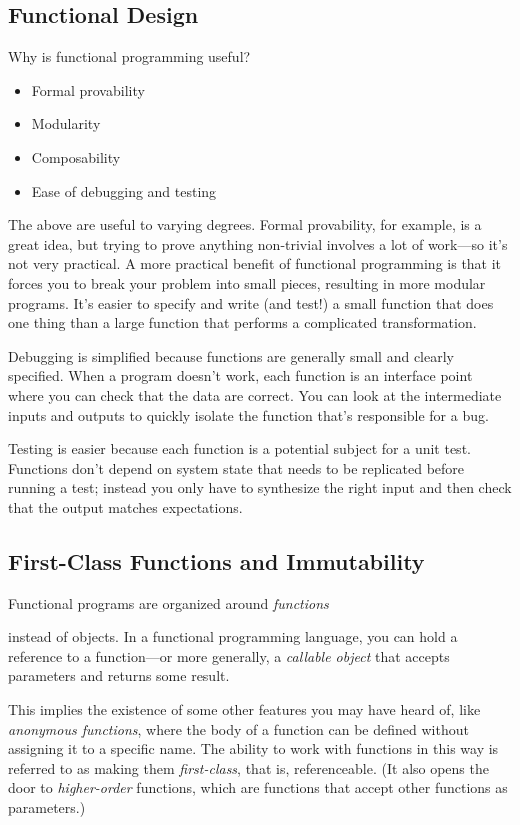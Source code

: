 \documentclass{article}\usepackage{beamerarticle}
\begin{document}
\subsection{Functional Design}
\begin{frame}
\noindent Why is functional programming useful?
\begin{itemize}
\pause \item Formal provability
\pause \item Modularity
\pause \item Composability
\pause \item Ease of debugging and testing
\end{itemize}
\end{frame}

\noindent The above are useful to varying degrees. Formal provability, for example, is a great idea, but trying to prove anything non-trivial involves a lot of work---so it's not very practical. A more practical benefit of functional programming is that it forces you to break your problem into small pieces, resulting in more modular programs.  It’s easier to specify and write (and test!) a small function that does one thing than a large function that performs a complicated transformation.

Debugging is simplified because functions are generally small and clearly specified. When a program doesn’t work, each function is an interface point where you can check that the data are correct. You can look at the intermediate inputs and outputs to quickly isolate the function that’s responsible for a bug.

Testing is easier because each function is a potential subject for a unit test. Functions don’t depend on system state that needs to be replicated before running a test; instead you only have to synthesize the right input and then check that the output matches expectations.

\subsection{First-Class Functions and Immutability}
\begin{frame}
Functional programs are organized around \textit{functions}
\end{frame}%
instead of objects. In a functional programming language, you can hold a reference to a function---or more generally, a \textit{callable object} that accepts parameters and returns some result.

This implies the existence of some other features you may have heard of, like \textit{anonymous functions}, where the body of a function can be defined without assigning it to a specific name. The ability to work with functions in this way is referred to as making them \textit{first-class}, that is, referenceable. (It also opens the door to \textit{higher-order} functions, which are functions that accept other functions as parameters.)
\end{document}
